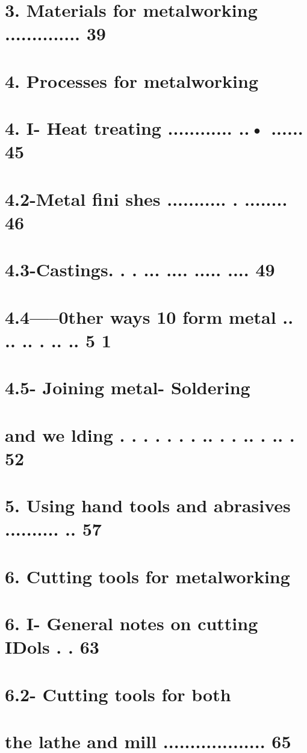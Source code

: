 \section{3. Materials for metalworking .............. 39}
\section{4. Processes for metalworking}
\section{4. I- Heat treating ............ ..• ...... 45}
\section{4.2-Metal fini shes ........... . ........ 46}
\section{4.3-Castings. . . ... .... ..... .... 49}
\section{4.4-----0ther ways 10 form metal .. .. .. . .. .. 5 1}
\section{4.5- Joining metal- Soldering}
\section{and we lding . . . . . . . .. . . .. . .. . 52}
\section{5. Using hand tools and abrasives .......... .. 57}
\section{6. Cutting tools for metalworking}
\section{6. I- General notes on cutting IDols . . 63}
\section{6.2- Cutting tools for both}
\section{the lathe and mill ................... 65}
